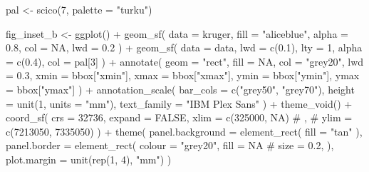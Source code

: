 \documentclass[]{article}
\newenvironment{Shaded}{}{}
\newcommand{\CommentTok}[1]{\textcolor[rgb]{0.00,0.50,0.00}{#1}}
\newcommand{\DataTypeTok}[1]{#1}
\newcommand{\DecValTok}[1]{#1}
\newcommand{\FloatTok}[1]{#1}
\newcommand{\KeywordTok}[1]{\textcolor[rgb]{0.00,0.00,1.00}{#1}}
\newcommand{\NormalTok}[1]{#1}
\newcommand{\OperatorTok}[1]{#1}
\newcommand{\OtherTok}[1]{\textcolor[rgb]{1.00,0.25,0.00}{#1}}
\newcommand{\StringTok}[1]{\textcolor[rgb]{0.00,0.50,0.50}{#1}}
\begin{document}
\begin{Shaded}
\begin{Highlighting}[]
\NormalTok{pal <-}\StringTok{ }\KeywordTok{scico}\NormalTok{(}\DecValTok{7}\NormalTok{, }\DataTypeTok{palette =} \StringTok{"turku"}\NormalTok{)}

\NormalTok{fig_inset_b <-}
\StringTok{  }\KeywordTok{ggplot}\NormalTok{() }\OperatorTok{+}
\StringTok{  }\KeywordTok{geom_sf}\NormalTok{(}
    \DataTypeTok{data =}\NormalTok{ kruger,}
    \DataTypeTok{fill =} \StringTok{"aliceblue"}\NormalTok{,}
    \DataTypeTok{alpha =} \FloatTok{0.8}\NormalTok{,}
    \DataTypeTok{col =} \OtherTok{NA}\NormalTok{,}
    \DataTypeTok{lwd =} \FloatTok{0.2}
\NormalTok{  ) }\OperatorTok{+}
\StringTok{  }\KeywordTok{geom_sf}\NormalTok{(}
    \DataTypeTok{data =}\NormalTok{ data,}
    \DataTypeTok{lwd =} \KeywordTok{c}\NormalTok{(}\FloatTok{0.1}\NormalTok{),}
    \DataTypeTok{lty =} \DecValTok{1}\NormalTok{,}
    \DataTypeTok{alpha =} \KeywordTok{c}\NormalTok{(}\FloatTok{0.4}\NormalTok{),}
    \DataTypeTok{col =}\NormalTok{ pal[}\DecValTok{3}\NormalTok{]}
\NormalTok{  ) }\OperatorTok{+}
\StringTok{  }\KeywordTok{annotate}\NormalTok{(}
    \DataTypeTok{geom =} \StringTok{"rect"}\NormalTok{,}
    \DataTypeTok{fill =} \OtherTok{NA}\NormalTok{,}
    \DataTypeTok{col =} \StringTok{"grey20"}\NormalTok{,}
    \DataTypeTok{lwd =} \FloatTok{0.3}\NormalTok{,}
    \DataTypeTok{xmin =}\NormalTok{ bbox[}\StringTok{"xmin"}\NormalTok{],}
    \DataTypeTok{xmax =}\NormalTok{ bbox[}\StringTok{"xmax"}\NormalTok{],}
    \DataTypeTok{ymin =}\NormalTok{ bbox[}\StringTok{"ymin"}\NormalTok{],}
    \DataTypeTok{ymax =}\NormalTok{ bbox[}\StringTok{"ymax"}\NormalTok{]}
\NormalTok{  ) }\OperatorTok{+}
\StringTok{  }\KeywordTok{annotation_scale}\NormalTok{(}
    \DataTypeTok{bar_cols =} \KeywordTok{c}\NormalTok{(}\StringTok{"grey50"}\NormalTok{, }\StringTok{"grey70"}\NormalTok{),}
    \DataTypeTok{height =} \KeywordTok{unit}\NormalTok{(}\DecValTok{1}\NormalTok{, }\DataTypeTok{units =} \StringTok{"mm"}\NormalTok{),}
    \DataTypeTok{text_family =} \StringTok{"IBM Plex Sans"}
\NormalTok{  ) }\OperatorTok{+}
\StringTok{  }\KeywordTok{theme_void}\NormalTok{() }\OperatorTok{+}
\StringTok{  }\KeywordTok{coord_sf}\NormalTok{(}
    \DataTypeTok{crs =} \DecValTok{32736}\NormalTok{,}
    \DataTypeTok{expand =} \OtherTok{FALSE}\NormalTok{,}
    \DataTypeTok{xlim =} \KeywordTok{c}\NormalTok{(}\DecValTok{325000}\NormalTok{, }\OtherTok{NA}\NormalTok{) }\CommentTok{# ,}
    \CommentTok{# ylim = c(7213050, 7335050)}
\NormalTok{  ) }\OperatorTok{+}
\StringTok{  }\KeywordTok{theme}\NormalTok{(}
    \DataTypeTok{panel.background =} \KeywordTok{element_rect}\NormalTok{(}
      \DataTypeTok{fill =} \StringTok{"tan"}
\NormalTok{    ),}
    \DataTypeTok{panel.border =} \KeywordTok{element_rect}\NormalTok{(}
      \DataTypeTok{colour =} \StringTok{"grey20"}\NormalTok{,}
      \DataTypeTok{fill =} \OtherTok{NA}
      \CommentTok{# size = 0.2,}
\NormalTok{    ),}
    \DataTypeTok{plot.margin =} \KeywordTok{unit}\NormalTok{(}\KeywordTok{rep}\NormalTok{(}\DecValTok{1}\NormalTok{, }\DecValTok{4}\NormalTok{), }\StringTok{"mm"}\NormalTok{)}
\NormalTok{  )}
\end{Highlighting}
\end{Shaded}
\end{document}
